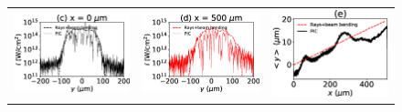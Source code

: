 \documentclass[%
 reprint,
 amsmath,amssymb,
 aps,
]{revtex4-1}
\begin{document}
\begin{figure}
\begin{tabular}{ccc}
\includegraphics[scale=0.39]{Figure/Icut0_te500_C6p.eps}
&\includegraphics[scale=0.39]{Figure/Icut500_te500_C6p.eps}
&\includegraphics[scale=0.39]{Figure/ymoy_te500_C6p.eps}

\end{tabular}
\end{figure}
\end{document}
